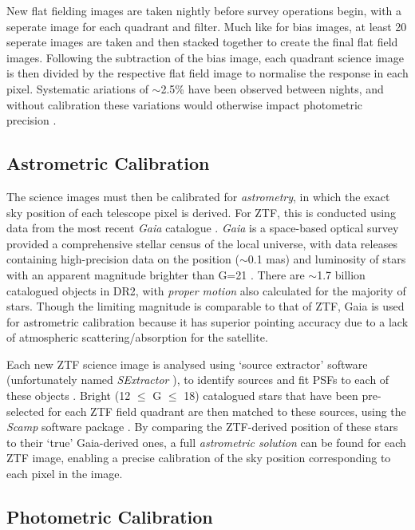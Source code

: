 New flat fielding images are taken nightly before survey operations begin, with a seperate image for each quadrant and filter. Much like for bias images, at least 20 seperate images are taken and then stacked together to create the final flat field images. Following the subtraction of the bias image, each quadrant science image is then divided by the respective flat field image to normalise the response in each pixel. Systematic ariations of $\sim$2.5\% have been observed between nights, and without calibration these variations would otherwise impact photometric precision \cite{ztf_data_processing}. 

\subsection*{Astrometric Calibration}

The science images must then be calibrated for \emph{astrometry}, in which the exact sky position of each telescope pixel is derived. For ZTF, this is conducted using data from the most recent \emph{Gaia} catalogue . \emph{Gaia} is a space-based optical survey provided a comprehensive stellar census of the local universe, with data releases containing high-precision data on the position ($\sim$0.1 mas) and luminosity of stars with an apparent magnitude brighter than G=21 \cite{gaia_dr2}. There are $\sim$1.7 billion catalogued objects in DR2, with \emph{proper motion} also calculated for the majority of stars. Though the limiting magnitude is comparable to that of ZTF, Gaia is used for astrometric calibration because it has superior pointing accuracy due to a lack of atmospheric scattering/absorption for the satellite.

Each new ZTF science image is analysed using `source extractor' software (unfortunately named \emph{SExtractor} ), to identify sources and fit PSFs to each of these objects \cite{ztf_data_processing}. Bright (12 $\leq$ G $\leq$ 18) catalogued stars that have been pre-selected for each ZTF field quadrant are then matched to these sources, using the \emph{Scamp} software package . By comparing the ZTF-derived position of these stars to their `true' Gaia-derived ones, a full \emph{astrometric solution} can be found for each ZTF image, enabling a precise calibration of the sky position corresponding to each pixel in the image.

\subsection*{Photometric Calibration}

